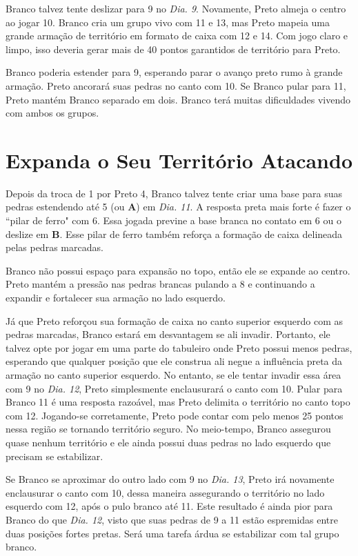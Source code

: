 Branco talvez tente deslizar  para 9 no \emph{Dia. 9}. Novamente, Preto almeja o centro ao jogar 10. Branco cria um grupo vivo com 11 e 13, mas Preto mapeia uma grande armação de território em formato de caixa com 12 e 14. Com jogo claro e limpo, isso deveria gerar mais de 40 pontos garantidos de território para Preto.

Branco poderia estender para 9, esperando parar o avanço preto rumo à grande armação. Preto ancorará suas pedras no canto com 10. Se Branco pular para 11, Preto mantém Branco separado em dois. Branco terá muitas dificuldades vivendo com ambos os grupos.

\section{Expanda o Seu Território Atacando}

Depois da troca de 1 por Preto 4, Branco talvez tente criar uma base para suas pedras estendendo até 5 (ou \textbf{A}) em \emph{Dia. 11}. A resposta preta mais forte é fazer o ``pilar de ferro" com 6. Essa jogada previne a base branca no contato em 6 ou o deslize em \textbf{B}. Esse pilar de ferro também reforça a formação de caixa delineada pelas pedras marcadas.

Branco não possui espaço para expansão no topo, então ele se expande ao centro. Preto mantém a pressão nas pedras brancas pulando a 8 e continuando a expandir e fortalecer sua armação no lado esquerdo.

Já que Preto reforçou sua formação de caixa no canto superior esquerdo com as pedras marcadas, Branco estará em desvantagem se ali invadir. Portanto, ele talvez opte por jogar em uma parte do tabuleiro onde Preto possui menos pedras, esperando que qualquer posição que ele construa ali negue a influência preta da armação no canto superior esquerdo. No entanto, se ele tentar invadir essa área com 9 no \emph{Dia. 12}, Preto simplesmente enclausurará o canto com 10. Pular para Branco 11 é uma resposta razoável, mas Preto delimita o território no canto topo com 12. Jogando-se corretamente, Preto pode contar com pelo menos 25 pontos nessa região se tornando território seguro. No meio-tempo, Branco assegurou quase nenhum território e ele ainda possui duas pedras no lado esquerdo que precisam se estabilizar. 

Se Branco se aproximar do outro lado com 9 no \emph{Dia. 13}, Preto irá novamente enclausurar o canto com 10, dessa maneira assegurando o território no lado esquerdo com 12, após o pulo branco até 11. Este resultado é ainda pior para Branco do que \emph{Dia. 12}, visto que suas pedras de 9 a 11 estão espremidas  entre duas posições fortes pretas. Será uma tarefa árdua se estabilizar com tal grupo branco.


